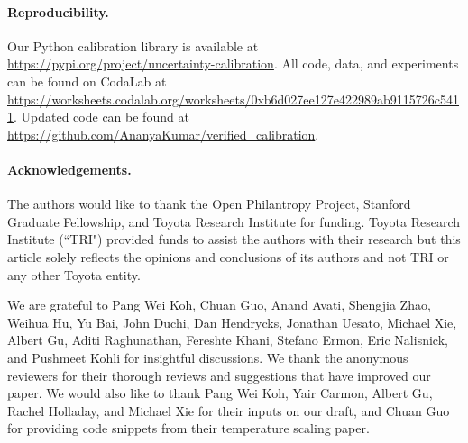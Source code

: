 \paragraph{Reproducibility.}
Our Python calibration library is available at \url{https://pypi.org/project/uncertainty-calibration}.
All code, data, and experiments can be found on CodaLab at \url{https://worksheets.codalab.org/worksheets/0xb6d027ee127e422989ab9115726c5411}.
Updated code can be found at \url{https://github.com/AnanyaKumar/verified_calibration}.

\paragraph{Acknowledgements.}

The authors would like to thank the Open Philantropy Project, Stanford Graduate Fellowship, and Toyota Research Institute for funding. Toyota Research Institute (``TRI") provided funds to assist the authors with their research but this article solely reflects the opinions and conclusions of its authors and not TRI or any other Toyota entity.

We are grateful to Pang Wei Koh, Chuan Guo, Anand Avati, Shengjia Zhao, Weihua Hu, Yu Bai, John Duchi, Dan Hendrycks, Jonathan Uesato, Michael Xie, Albert Gu, Aditi Raghunathan, Fereshte Khani, Stefano Ermon, Eric Nalisnick, and Pushmeet Kohli for insightful discussions. We thank the anonymous reviewers for their thorough reviews and suggestions that have improved our paper. We would also like to thank Pang Wei Koh, Yair Carmon, Albert Gu, Rachel Holladay, and Michael Xie for their inputs on our draft, and Chuan Guo for providing code snippets from their temperature scaling paper.






